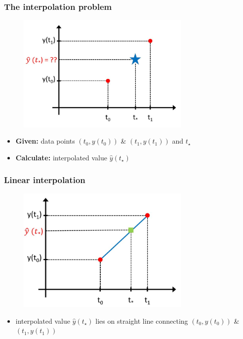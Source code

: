 \documentclass[english,14pt]{beamer}
\begin{document}

\begin{frame}[fragile]

\frametitle{The interpolation problem}

\vspace*{-5mm}
\begin{figure}[ht]
	\centering
	\includegraphics[width=0.75\textwidth]{figures/InterpMeaning}
\end{figure}
\vspace*{-5mm}
\begin{itemize}
	\item[] \textbf{Given:} data points $(t_0,y(t_0))$ \& $(t_1,y(t_1))$ and $t_\star$
	\item[] \textbf{Calculate:} interpolated value $\hat{y}(t_\star)$
\end{itemize}

\end{frame}


\begin{frame}[fragile]

\frametitle{Linear interpolation}

\vspace*{-3mm}
\begin{figure}[ht]
	\centering
	\includegraphics[width=0.75\textwidth]{figures/LinInterpMeaning}
\end{figure}
\vspace*{-5mm}
\begin{itemize}
	\item interpolated value $\hat{y}(t_\star)$ lies on straight line connecting $(t_0,y(t_0))$ \& $(t_1,y(t_1))$
\end{itemize}

\end{frame}
\end{document}
